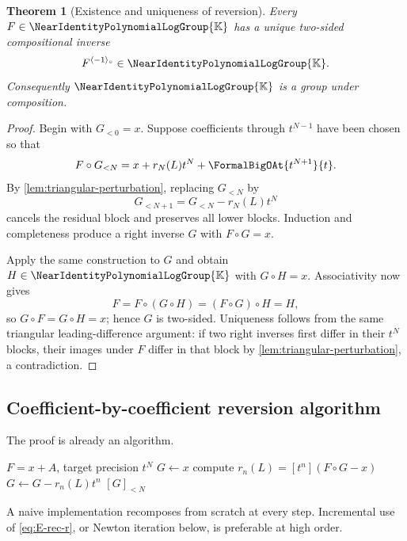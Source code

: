\documentclass[11pt]{article}
\theoremstyle{pltheorem}
\newtheorem{theorem}{Theorem}[section]
\newcommand{\K}{\mathbb K}
\newcommand{\Gnear}{\NearIdentityPolynomialLogGroup{\K}}
\newcommand{\rev}{\langle-1\rangle_{\circ}}
\newcommand{\compose}{\mathbin{\circ}}
\begin{document}
\begin{theorem}[Existence and uniqueness of reversion]\label{thm:reversion-existence}
Every \(F\in\Gnear\) has a unique two-sided compositional inverse
\begin{equation}\label{eq:inverse-in-Gnear}
 F^{\rev}\in\Gnear.
\end{equation}
Consequently \(\Gnear\) is a group under composition.
\end{theorem}

\begin{proof}
Begin with \(G_{<0}=x\).  Suppose coefficients through \(t^{N-1}\) have been chosen so that
\begin{equation}\label{eq:reversion-residual-N}
 F\compose G_{<N}=x+r_N(L)t^N+\FormalBigOAt{t^{N+1}}{t}.
\end{equation}
By \cref{lem:triangular-perturbation}, replacing \(G_{<N}\) by
\[
 G_{<N+1}=G_{<N}-r_N(L)t^N
\]
cancels the residual block and preserves all lower blocks.  Induction and completeness produce a right inverse \(G\) with \(F\compose G=x\).

Apply the same construction to \(G\) and obtain \(H\in\Gnear\) with
\(G\compose H=x\).  Associativity now gives
\[
 F=F\compose(G\compose H)=(F\compose G)\compose H=H,
\]
so \(G\compose F=G\compose H=x\); hence \(G\) is two-sided.  Uniqueness follows from the same triangular leading-difference argument: if two right inverses first differ in their \(t^N\) blocks, their images under \(F\) differ in that block by \cref{lem:triangular-perturbation}, a contradiction.
\end{proof}

\subsection{Coefficient-by-coefficient reversion algorithm}

The proof is already an algorithm.

\begin{algorithm}[htbp]
\caption{Triangular reversion in \(\Gnear\)}
\label{alg:triangular-reversion}
\begin{algorithmic}[1]
\Require \(F=x+A\), target precision \(t^N\)
\State \(G\gets x\)
  \State compute \(r_n(L)=[t^n](F\compose G-x)\)
  \State \(G\gets G-r_n(L)t^n\)
\EndFor
\State \Return \([G]_{<N}\)
\end{algorithmic}
\end{algorithm}

A naive implementation recomposes from scratch at every step.  Incremental use of \cref{eq:E-rec-r}, or Newton iteration below, is preferable at high order.
\end{document}

